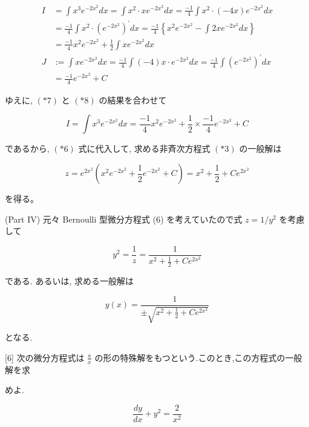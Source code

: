 \documentclass[10pt]{article}
\begin{document}
\begin{align*}
I & =\int x^{3} e^{-2 x^{2}} d x=\int x^{2} \cdot x e^{-2 x^{2}} d x=\frac{-1}{4} \int x^{2} \cdot(-4 x) e^{-2 x^{2}} d x \\
& =\frac{-1}{4} \int x^{2} \cdot\left(e^{-2 x^{2}}\right)^{\prime} d x=\frac{-1}{4}\left\{x^{2} e^{-2 x^{2}}-\int 2 x e^{-2 x^{2}} d x\right\} \\
& =\frac{-1}{4} x^{2} e^{-2 x^{2}}+\frac{1}{2} \int x e^{-2 x^{2}} d x  \tag{*7}\\
J & :=\int x e^{-2 x^{2}} d x=\frac{-1}{4} \int(-4) x \cdot e^{-2 x^{2}} d x=\frac{-1}{4} \int\left(e^{-2 x^{2}}\right)^{\prime} d x \\
& =\frac{-1}{4} e^{-2 x^{2}}+C \tag{*8}
\end{align*}


ゆえに, $(* 7)$ と $(* 8)$ の結果を合わせて

$$
I=\int x^{3} e^{-2 x^{2}} d x=\frac{-1}{4} x^{2} e^{-2 x^{2}}+\frac{1}{2} \times \frac{-1}{4} e^{-2 x^{2}}+C
$$

であるから, $(* 6)$ 式に代入して, 求める非斉次方程式 $(* 3)$ の一般解は


\begin{equation*}
z=e^{2 x^{2}}\left(x^{2} e^{-2 x^{2}}+\frac{1}{2} e^{-2 x^{2}}+C\right)=x^{2}+\frac{1}{2}+C e^{2 x^{2}} \tag{*9}
\end{equation*}


を得る。

(Part IV) 元々 Bernoulli 型微分方程式 (6) を考えていたので式 $z=1 / y^{2}$ を考慮して


\begin{equation*}
y^{2}=\frac{1}{z}=\frac{1}{x^{2}+\frac{1}{2}+C e^{2 x^{2}}} \tag{*10}
\end{equation*}


である. あるいは, 求める一般解は


\begin{equation*}
y(x)=\frac{1}{ \pm \sqrt{x^{2}+\frac{1}{2}+C e^{2 x^{2}}}} \tag{*11}
\end{equation*}


となる.

[6] 次の微分方程式は $\frac{a}{x}$ の形の特殊解をもつという.このとき,この方程式の一般解を求

めよ.


\begin{equation*}
\frac{d y}{d x}+y^{2}=\frac{2}{x^{2}} \tag{7}
\end{equation*}
\end{document}
